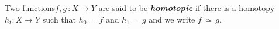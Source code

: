 \documentclass[preview]{standalone}
\begin{document}
\begin{center}
Two functions$f$,$\,g$$\,: X\to Y$ are said to be \textbf{\textit{homotopic}} if there is a homotopy $h_t : X\to Y$ such that $h_0=$$\,f$ and $h_1=$$\,g$ and we write $f$\,$\simeq$\,$g$.
\end{center}
\end{document}
